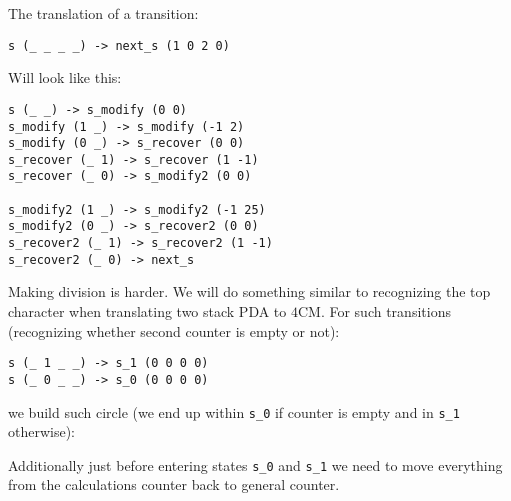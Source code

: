 \documentclass[english,shortabstract,mgr]{iithesis}
\begin{document}
The translation of a transition:
\begin{verbatim}
s (_ _ _ _) -> next_s (1 0 2 0)
\end{verbatim}

Will look like this:
\begin{verbatim}
s (_ _) -> s_modify (0 0)
s_modify (1 _) -> s_modify (-1 2)
s_modify (0 _) -> s_recover (0 0)
s_recover (_ 1) -> s_recover (1 -1)
s_recover (_ 0) -> s_modify2 (0 0)

s_modify2 (1 _) -> s_modify2 (-1 25)
s_modify2 (0 _) -> s_recover2 (0 0)
s_recover2 (_ 1) -> s_recover2 (1 -1)
s_recover2 (_ 0) -> next_s
\end{verbatim}


Making division is harder. We will do something similar to recognizing the top
character when translating two stack PDA to $4$CM. For such transitions (recognizing
whether second counter is empty or not):
\begin{verbatim}
s (_ 1 _ _) -> s_1 (0 0 0 0)
s (_ 0 _ _) -> s_0 (0 0 0 0)
\end{verbatim}

we build such circle (we end up within \texttt{s\_0} if counter is empty and in \texttt{s\_1} otherwise):

\begin{center}
\end{center}

Additionally just before entering states \texttt{s\_0} and \texttt{s\_1}
we need to move everything from the calculations counter back to general counter.
\end{document}
